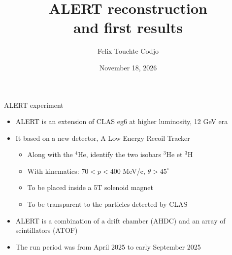 \documentclass[10pt,aspectratio=43]{beamer}
\title{ALERT reconstruction \\and first results}
\author{Felix Touchte Codjo}
\institute{IJCLab}
\date{November 18, 2026}
\begin{document}
\begin{frame}[plain] %
\titlepage
\end{frame}


\begin{frame}{ALERT experiment}
    \begin{itemize}
        \item ALERT is an extension of CLAS eg6 at higher luminosity, 12 GeV era
        \item It based on a new detector, A Low Energy Recoil Tracker
            \begin{itemize}
                \item Along with the $^4\mbox{He}$, identify the two isobars $^3\mbox{He}$ et $^3\mbox{H}$
                \item With kinematics: $70 < p < 400$ MeV/c, $\theta > 45^\circ$
                \item To be placed inside a 5T solenoid magnet
                \item To be transparent to the particles detected by CLAS
            \end{itemize}
        \item ALERT is a combination of a drift chamber (AHDC) and an array of scintillators (ATOF)
        \item The run period was from April 2025 to early September 2025
    \end{itemize}

    \vspace{0.3cm}
    \centering


\end{frame}
\end{document}
